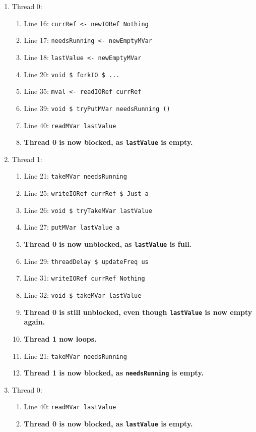 \begin{enumerate}
\item Thread 0:
  \begin{enumerate}
  \item Line 16: \verb|currRef <- newIORef Nothing|
  \item Line 17: \verb|needsRunning <- newEmptyMVar|
  \item Line 18: \verb|lastValue <- newEmptyMVar|
  \item Line 20: \verb|void $ forkIO $ ...|
  \item Line 35: \verb|mval <- readIORef currRef|
  \item Line 39: \verb|void $ tryPutMVar needsRunning ()|
  \item Line 40: \verb|readMVar lastValue|
  \item \textbf{Thread 0 is now blocked, as \texttt{lastValue} is empty.}
  \end{enumerate}
\item Thread 1:
  \begin{enumerate}
  \item Line 21: \verb|takeMVar needsRunning|
  \item Line 25: \verb|writeIORef currRef $ Just a|
  \item Line 26: \verb|void $ tryTakeMVar lastValue|
  \item Line 27: \verb|putMVar lastValue a|
  \item \textbf{Thread 0 is now unblocked, as \texttt{lastValue} is full.}
  \item Line 29: \verb|threadDelay $ updateFreq us|
  \item Line 31: \verb|writeIORef currRef Nothing|
  \item Line 32: \verb|void $ takeMVar lastValue|
  \item \textbf{Thread 0 is still unblocked, even though \texttt{lastValue} is now empty again.}
  \item \textbf{Thread 1 now loops.}
  \item Line 21: \verb|takeMVar needsRunning|
  \item \textbf{Thread 1 is now blocked, as \texttt{needsRunning} is empty.}
  \end{enumerate}
\item Thread 0:
  \begin{enumerate}
  \item Line 40: \verb|readMVar lastValue|
  \item \textbf{Thread 0 is now blocked, as \texttt{lastValue} is empty.}
  \end{enumerate}
\end{enumerate}

